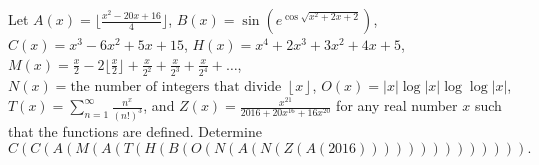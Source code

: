 Let $A(x)=\lfloor\frac{x^2-20x+16}{4}\rfloor$, $B(x)=\sin\left(e^{\cos\sqrt{x^2+2x+2}}\right)$, $C(x)=x^3-6x^2+5x+15$, $H(x)=x^4+2x^3+3x^2+4x+5$, $M(x)=\frac{x}{2}-2\lfloor\frac{x}{2}\rfloor+\frac{x}{2^2}+\frac{x}{2^3}+\frac{x}{2^4}+\ldots$, $N(x)=\textrm{the number of integers that divide }\left\lfloor x\right\rfloor$, $O(x)=|x|\log |x|\log\log |x|$, $T(x)=\sum_{n=1}^{\infty}\frac{n^x}{\left(n!\right)^3}$, and $Z(x)=\frac{x^{21}}{2016+20x^{16}+16x^{20}}$ for any real number $x$ such that the functions are defined. Determine $$C(C(A(M(A(T(H(B(O(N(A(N(Z(A(2016)))))))))))))).$$